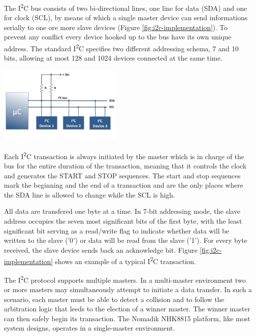 \documentclass[a4paper,10pt]{article}
\makeatletter
\newenvironment{figurehere}{\def\@captype{figure}\vspace{2ex}}{\vspace{2ex}}
\newcommand{\iic}{I\textsuperscript{2}C }
\makeatother
\begin{document}
\begin{multicols}{2}
The \iic bus consists of two bi-directional lines, one line for data (SDA)
and one for clock (SCL), by means of which a single master device can send
informations serially to one ore more slave devices (Figure
\ref{fig:i2c-implementation}).
To prevent any conflict every device hooked up to the bus have its own unique
address. The standard \iic specifies two different addressing schema, 7 and
10 bits, allowing at most 128 and 1024 devices connected at the same time.

\begin{figurehere}
 \centering
 \includegraphics[width=6cm]{./figures/i2c-diagram.png}
 \caption{Sample \iic implementation (adapted from \emph{embedded-lab.com}).}
 \label{fig:i2c-implementation}
\end{figurehere}

Each \iic transaction is always initiated by the master which is in charge of
the bus for the entire duration of the transaction, meaning that it controls the
clock and generates the START and STOP sequences. The start and stop sequences
mark the beginning and the end of a transaction and are the only places where
the SDA line is allowed to change while the SCL is high.

All data are transfered one byte at a time. In 7-bit addressing mode, the slave
address occupies the seven most significant bits of the first byte, with the
least significant bit serving as a read/write flag to indicate whether data
will be written to the slave ('0') or data will be read from the slave ('1').
For every byte received, the slave device sends back an acknowledge bit.
Figure \ref{fig:i2c-implementation} shows an example of a typical \iic
transaction.

The \iic protocol supports multiple masters. In a multi-master environment two
or more masters may simultaneously attempt to initiate a data transfer.
In such a scenario, each master must be able to detect a collision and to follow
the arbitration logic that leeds to the election of a winner master. The winner
master can then safely begin its transaction.
The Nomadik NHK8815 platform, like most system designs, operates in a 
single-master environment.


\end{multicols}
\end{document}
